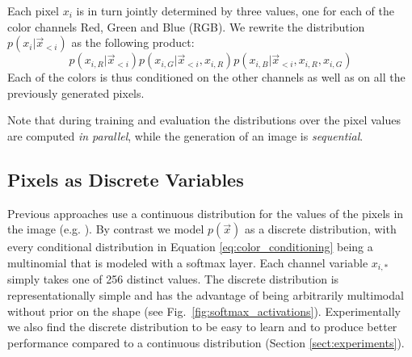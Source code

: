 Each pixel $x_i$ is in turn jointly determined by three values, one for each of the color channels Red, Green and Blue (RGB). We rewrite the distribution $p(x_i|\vec{x}_{<i})$ as the following product:
\begin{equation}
p(x_{i,R}|\vec{x}_{<i})p(x_{i,G}|\vec{x}_{<i},x_{i,R})p(x_{i,B}|\vec{x}_{<i},x_{i,R},x_{i,G})
\label{eq:color_conditioning}
\end{equation} 
Each of the colors is thus conditioned on the other channels as well as on all the previously generated pixels. 

Note that during {training} and evaluation the distributions over the pixel values are computed \emph{in parallel}, while the generation of an image is \emph{sequential}. 

\subsection{Pixels as Discrete Variables}

Previous approaches use a continuous distribution for the values of the pixels in the image (e.g. \citet{theis2015generative, uria2013deep}). By contrast we model $p(\vec{x})$ as a discrete distribution, with every conditional distribution in Equation \ref{eq:color_conditioning} being a multinomial that is modeled with a softmax layer. Each channel variable $x_{i,*}$ simply takes one of 256 distinct values. The discrete distribution is representationally simple and has the advantage of being arbitrarily multimodal without prior on the shape (see Fig.~\ref{fig:softmax_activations}). Experimentally we also find the discrete distribution to be easy to learn and to produce better performance compared to a continuous distribution (Section \ref{sect:experiments}). 














